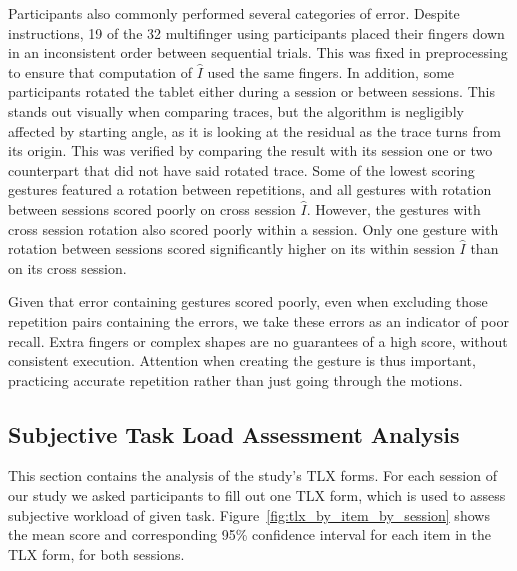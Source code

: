 \documentclass{sig-alternate-10pt}
\begin{document}
Participants also commonly performed several categories of error. Despite instructions, 19 of the 32 multifinger using participants placed their fingers down in an inconsistent order between sequential trials. This was fixed in preprocessing to ensure that computation of $\hat{I}$ used the same fingers. In addition, some participants rotated the tablet either during a session or between sessions. This stands out visually when comparing traces, but the algorithm is negligibly affected by starting angle, as it is looking at the residual as the trace turns from its origin. This was verified by comparing the result with its session one or two counterpart that did not have said rotated trace. Some of the lowest scoring gestures featured a rotation between repetitions, and all gestures with rotation between sessions scored poorly on cross session $\hat{I}$. However, the gestures with cross session rotation also scored poorly within a session. Only one gesture with rotation between sessions scored significantly higher on its within session $\hat{I}$ than on its cross session.

Given that error containing gestures scored poorly, even when excluding those repetition pairs containing the errors, we take these errors as an indicator of poor recall. Extra fingers or complex shapes are no guarantees of a high score, without consistent execution. Attention when creating the gesture is thus important, practicing accurate repetition rather than just going through the motions. 





























\subsection{Subjective Task Load Assessment \newline Analysis}






This section contains the analysis of the study's TLX forms. For each session of our study we asked participants to fill out one TLX form, which is used to assess subjective workload of given task. Figure~\ref{fig:tlx_by_item_by_session} shows the mean score and corresponding 95\% confidence interval for each item in the TLX form, for both sessions. 
\end{document}
